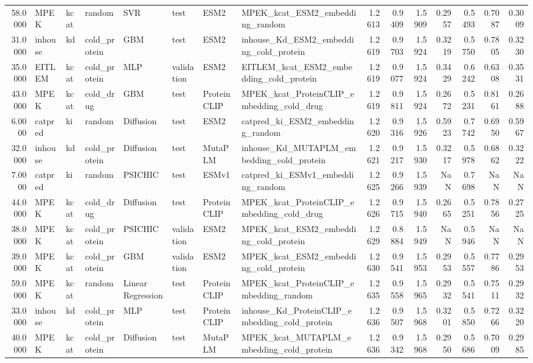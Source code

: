 \begin{tabular}{rlllllllrrrrrrr}
58.0000 & MPEK & kcat & random & SVR & test & ESM2 & MPEK_kcat_ESM2_embedding_random & 1.2613 & 0.9409 & 1.5909 & 0.2957 & 0.5493 & 0.7087 & 0.3009 \\
31.0000 & inhouse & kd & cold_protein & GBM & test & ESM2 & inhouse_Kd_ESM2_embedding_cold_protein & 1.2619 & 0.9703 & 1.5924 & 0.3219 & 0.5750 & 0.7805 & 0.3230 \\
35.0000 & EITLEM & kcat & cold_protein & MLP & validation & ESM2 & EITLEM_kcat_ESM2_embedding_cold_protein & 1.2619 & 0.9077 & 1.5924 & 0.3429 & 0.6242 & 0.6308 & 0.3531 \\
43.0000 & MPEK & kcat & cold_drug & GBM & test & ProteinCLIP & MPEK_kcat_ProteinCLIP_embedding_cold_drug & 1.2619 & 0.9811 & 1.5924 & 0.2672 & 0.5231 & 0.8161 & 0.2688 \\
6.0000 & catpred & ki & random & Diffusion & test & ESM2 & catpred_ki_ESM2_embedding_random & 1.2620 & 0.9316 & 1.5926 & 0.5923 & 0.7742 & 0.6950 & 0.5967 \\
32.0000 & inhouse & kd & cold_protein & Diffusion & test & MutaPLM & inhouse_Kd_MUTAPLM_embedding_cold_protein & 1.2621 & 0.9217 & 1.5930 & 0.3217 & 0.5978 & 0.6862 & 0.3222 \\
7.0000 & catpred & ki & random & PSICHIC & test & ESMv1 & catpred_ki_ESMv1_embedding_random & 1.2625 & 0.9266 & 1.5939 & NaN & 0.7698 & NaN & NaN \\
44.0000 & MPEK & kcat & cold_drug & Diffusion & test & ProteinCLIP & MPEK_kcat_ProteinCLIP_embedding_cold_drug & 1.2626 & 0.9715 & 1.5940 & 0.2665 & 0.5251 & 0.7856 & 0.2725 \\
38.0000 & MPEK & kcat & cold_protein & PSICHIC & validation & ESM2 & MPEK_kcat_ESM2_embedding_cold_protein & 1.2629 & 0.8884 & 1.5949 & NaN & 0.5946 & NaN & NaN \\
39.0000 & MPEK & kcat & cold_protein & GBM & validation & ESM2 & MPEK_kcat_ESM2_embedding_cold_protein & 1.2630 & 0.9541 & 1.5953 & 0.2953 & 0.5557 & 0.7786 & 0.2953 \\
59.0000 & MPEK & kcat & random & Linear Regression & test & ProteinCLIP & MPEK_kcat_ProteinCLIP_embedding_random & 1.2635 & 0.9558 & 1.5965 & 0.2932 & 0.5541 & 0.7511 & 0.2932 \\
33.0000 & inhouse & kd & cold_protein & MLP & test & ProteinCLIP & inhouse_Kd_ProteinCLIP_embedding_cold_protein & 1.2636 & 0.9507 & 1.5968 & 0.3201 & 0.5850 & 0.7266 & 0.3220 \\
40.0000 & MPEK & kcat & cold_protein & Diffusion & test & MutaPLM & MPEK_kcat_MUTAPLM_embedding_cold_protein & 1.2636 & 0.9342 & 1.5968 & 0.2950 & 0.5686 & 0.7009 & 0.2985 \\

\end{tabular}

